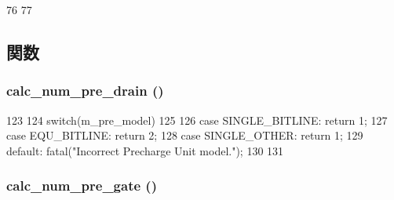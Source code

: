 \begin{DoxyCode}
76 {
77 }
\end{DoxyCode}


\subsection{関数}
\hypertarget{classPrechargeUnit_adf0eb6048a8f92a38c67dd1deb385dd0}{
\subsubsection[{calc\_\-num\_\-pre\_\-drain}]{ calc\_\-num\_\-pre\_\-drain ()}}
\label{classPrechargeUnit_adf0eb6048a8f92a38c67dd1deb385dd0}



\begin{DoxyCode}
123 {
124     switch(m_pre_model)
125     {
126         case SINGLE_BITLINE: return 1;
127         case EQU_BITLINE:    return 2;
128         case SINGLE_OTHER:   return 1;
129         default: fatal("Incorrect Precharge Unit model.\n");
130     }
131 }
\end{DoxyCode}
\hypertarget{classPrechargeUnit_aa7632b627f168ac293810ce062a2c849}{
\subsubsection[{calc\_\-num\_\-pre\_\-gate}]{ calc\_\-num\_\-pre\_\-gate ()}}
\label{classPrechargeUnit_aa7632b627f168ac293810ce062a2c849}



